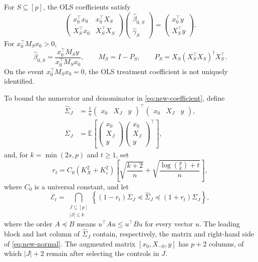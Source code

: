 \documentclass[a4paper,10pt,english]{article}
\theoremstyle{definition}
\begin{document}
\begin{review}
For \(S\subseteq[p]\), the OLS coefficients satisfy
\begin{equation}\label{eq:new-normal}
 \begin{pmatrix}
 x_0^\top x_0&x_0^\top X_S\\
 X_S^\top x_0&X_S^\top X_S
 \end{pmatrix}
 \begin{pmatrix}\hat\beta_{0,S}\\\hat\gamma_S\end{pmatrix}
 =
 \begin{pmatrix}x_0^\top y\\X_S^\top y\end{pmatrix}.
\end{equation}
\rbreak
For \(x_0^\top M_Sx_0>0\),
\begin{equation}\label{eq:new-coefficient}
 \hat\beta_{0,S}
 =\frac{x_0^\top M_Sy}{x_0^\top M_Sx_0},
 \qquad M_S=I-P_S,
 \qquad P_S=X_S(X_S^\top X_S)^\dagger X_S^\top.
\end{equation}
\rbreak
On the event \(x_0^\top M_Sx_0=0\), the OLS treatment coefficient
is not uniquely identified.

To bound the numerator and denominator in
\eqref{eq:new-coefficient}, define
\begin{equation}\label{eq:new-augmented}
 \begin{aligned}
 \widehat\Sigma_J
 &=\frac1n
 \begin{pmatrix}x_0&X_J&y\end{pmatrix}^{\!\top}
 \begin{pmatrix}x_0&X_J&y\end{pmatrix},\\
 \Sigma_J
 &=\mathbb E\left[
 \begin{pmatrix}x_0\\X_J\\y\end{pmatrix}
 \begin{pmatrix}x_0\\X_J\\y\end{pmatrix}^{\!\top}
 \right],
 \end{aligned}
\end{equation}
and, for \(k=\min(2s,p)\) and \(t\ge1\), set
\begin{equation}\label{eq:new-radius}
 r_t=C_0(K_X^2+K_\varepsilon^2)
 \left[
 \sqrt{\frac{k+2}{n}}
 +\sqrt{\frac{\log\binom pk+t}{n}}
 \right],
\end{equation}
where \(C_0\) is a universal constant, and let
\begin{equation}\label{eq:new-event}
 \mathcal E_t
 =\bigcap_{\substack{J\subseteq[p]\\|J|\le k}}
 \left\{
 (1-r_t)\Sigma_J\preceq\widehat\Sigma_J
 \preceq(1+r_t)\Sigma_J
 \right\},
\end{equation}
where the order \(A\preceq B\) means
\(u^\top Au\le u^\top Bu\) for every vector \(u\).
\rbreak
The leading block and last column of \(\widehat\Sigma_J\) contain,
respectively, the matrix and right-hand side of \eqref{eq:new-normal}.
\rbreak
The augmented matrix \([x_0,X_{-0},y]\) has \(p+2\) columns,
of which \(|J|+2\) remain after selecting the controls in \(J\).


\end{review}
\end{document}
